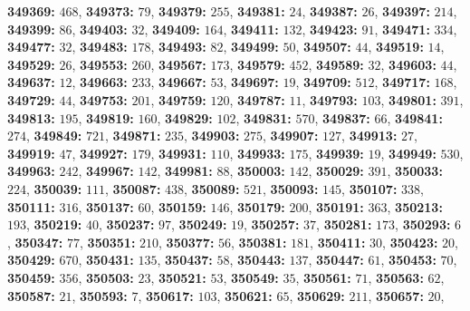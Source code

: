 \textsf{\bfseries 349369:} $468$, \textsf{\bfseries 349373:} $79$, \textsf{\bfseries 349379:} $255$, \textsf{\bfseries 349381:} $24$, \textsf{\bfseries 349387:} $26$, \textsf{\bfseries 349397:} $214$, \textsf{\bfseries 349399:} $86$, \textsf{\bfseries 349403:} $32$, \textsf{\bfseries 349409:} $164$, \textsf{\bfseries 349411:} $132$, \textsf{\bfseries 349423:} $91$, \textsf{\bfseries 349471:} $334$, \textsf{\bfseries 349477:} $32$, \textsf{\bfseries 349483:} $178$, \textsf{\bfseries 349493:} $82$, \textsf{\bfseries 349499:} $50$, \textsf{\bfseries 349507:} $44$, \textsf{\bfseries 349519:} $14$, \textsf{\bfseries 349529:} $26$, \textsf{\bfseries 349553:} $260$, \textsf{\bfseries 349567:} $173$, \textsf{\bfseries 349579:} $452$, \textsf{\bfseries 349589:} $32$, \textsf{\bfseries 349603:} $44$, \textsf{\bfseries 349637:} $12$, \textsf{\bfseries 349663:} $233$, \textsf{\bfseries 349667:} $53$, \textsf{\bfseries 349697:} $19$, \textsf{\bfseries 349709:} $512$, \textsf{\bfseries 349717:} $168$, \textsf{\bfseries 349729:} $44$, \textsf{\bfseries 349753:} $201$, \textsf{\bfseries 349759:} $120$, \textsf{\bfseries 349787:} $11$, \textsf{\bfseries 349793:} $103$, \textsf{\bfseries 349801:} $391$, \textsf{\bfseries 349813:} $195$, \textsf{\bfseries 349819:} $160$, \textsf{\bfseries 349829:} $102$, \textsf{\bfseries 349831:} $570$, \textsf{\bfseries 349837:} $66$, \textsf{\bfseries 349841:} $274$, \textsf{\bfseries 349849:} $721$, \textsf{\bfseries 349871:} $235$, \textsf{\bfseries 349903:} $275$, \textsf{\bfseries 349907:} $127$, \textsf{\bfseries 349913:} $27$, \textsf{\bfseries 349919:} $47$, \textsf{\bfseries 349927:} $179$, \textsf{\bfseries 349931:} $110$, \textsf{\bfseries 349933:} $175$, \textsf{\bfseries 349939:} $19$, \textsf{\bfseries 349949:} $530$, \textsf{\bfseries 349963:} $242$, \textsf{\bfseries 349967:} $142$, \textsf{\bfseries 349981:} $88$, \textsf{\bfseries 350003:} $142$, \textsf{\bfseries 350029:} $391$, \textsf{\bfseries 350033:} $224$, \textsf{\bfseries 350039:} $111$, \textsf{\bfseries 350087:} $438$, \textsf{\bfseries 350089:} $521$, \textsf{\bfseries 350093:} $145$, \textsf{\bfseries 350107:} $338$, \textsf{\bfseries 350111:} $316$, \textsf{\bfseries 350137:} $60$, \textsf{\bfseries 350159:} $146$, \textsf{\bfseries 350179:} $200$, \textsf{\bfseries 350191:} $363$, \textsf{\bfseries 350213:} $193$, \textsf{\bfseries 350219:} $40$, \textsf{\bfseries 350237:} $97$, \textsf{\bfseries 350249:} $19$, \textsf{\bfseries 350257:} $37$, \textsf{\bfseries 350281:} $173$, \textsf{\bfseries 350293:} $6$, \textsf{\bfseries 350347:} $77$, \textsf{\bfseries 350351:} $210$, \textsf{\bfseries 350377:} $56$, \textsf{\bfseries 350381:} $181$, \textsf{\bfseries 350411:} $30$, \textsf{\bfseries 350423:} $20$, \textsf{\bfseries 350429:} $670$, \textsf{\bfseries 350431:} $135$, \textsf{\bfseries 350437:} $58$, \textsf{\bfseries 350443:} $137$, \textsf{\bfseries 350447:} $61$, \textsf{\bfseries 350453:} $70$, \textsf{\bfseries 350459:} $356$, \textsf{\bfseries 350503:} $23$, \textsf{\bfseries 350521:} $53$, \textsf{\bfseries 350549:} $35$, \textsf{\bfseries 350561:} $71$, \textsf{\bfseries 350563:} $62$, \textsf{\bfseries 350587:} $21$, \textsf{\bfseries 350593:} $7$, \textsf{\bfseries 350617:} $103$, \textsf{\bfseries 350621:} $65$, \textsf{\bfseries 350629:} $211$, \textsf{\bfseries 350657:} $20$, 
